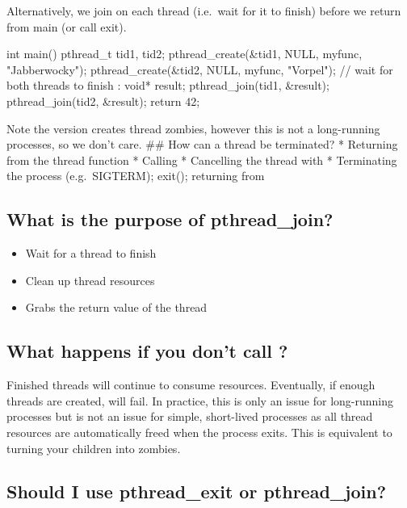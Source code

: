 Alternatively, we join on each thread (i.e.~wait for it to finish) before we return from main (or call exit).

\begin{code}[language=C]
int main() {
  pthread_t tid1, tid2;
  pthread_create(&tid1, NULL, myfunc, "Jabberwocky");
  pthread_create(&tid2, NULL, myfunc, "Vorpel");
  // wait for both threads to finish :
  void* result;
  pthread_join(tid1, &result);
  pthread_join(tid2, &result); 
  return 42;
}
\end{code}

Note the  version creates thread zombies, however this is not a long-running processes, so we don't care. \#\# How can a thread be terminated? * Returning from the thread function * Calling  * Cancelling the thread with  * Terminating the process (e.g.~SIGTERM); exit(); returning from 

\subsection{What is the purpose of pthread\_join?}\label{what-is-the-purpose-of-pthreadux5fjoin}

\begin{itemize}
\tightlist
\item
  Wait for a thread to finish
\item
  Clean up thread resources
\item
  Grabs the return value of the thread
\end{itemize}

\subsection{\texorpdfstring{What happens if you don't call ?}{What happens if you don't call pthread\_join?}}\label{what-happens-if-you-dont-call-pthreadux5fjoin}

Finished threads will continue to consume resources. Eventually, if enough threads are created,  will fail. In practice, this is only an issue for long-running processes but is not an issue for simple, short-lived processes as all thread resources are automatically freed when the process exits. This is equivalent to turning your children into zombies.

\subsection{Should I use pthread\_exit or pthread\_join?}

